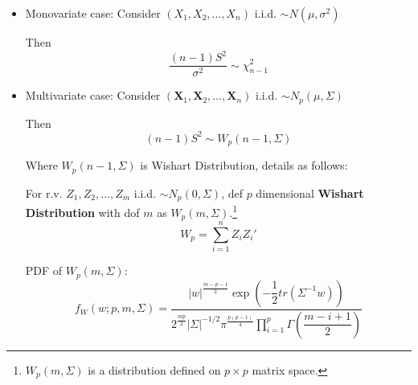 \begin{itemize}[topsep=2pt,itemsep=2pt]
    \item Monovariate case: Consider $ (X_1,X_2,\ldots,X_n) $ i.i.d. $ \sim N(\mu,\sigma ^2) $

    
    

    Then 
    \[
        \dfrac{(n-1)S^2}{\sigma ^2}\sim \chi^2_{n-1} 
    \]
    
    \item Multivariate case: Consider $ (\mathbf{X}_{1},\mathbf{X}_{2},\ldots,\mathbf{X}_{n})  $ i.i.d. $ \sim N_p(\mu,\Sigma ) $
    
    Then
    \[
        (n-1) S^2\sim W_p(n-1,\Sigma )
    \]
    
    Where $ W_p(n-1,\Sigma ) $ is Wishart Distribution, details as follows:

         For r.v. $ Z_1,Z_2,\ldots,Z_m $ i.i.d. $ \sim N_p(0,\Sigma  ) $, def $ p $ dimensional \textbf{Wishart Distribution } with dof $ m $ as $ W_p(m,\Sigma ) $.\footnote{$ W_p(m,\Sigma ) $ is a distribution defined on $ p\times p $ matrix space.}
        \begin{equation}
            W_p=\sum_{i=1}^nZ_iZ_i' 
        \end{equation}

        
        PDF of $ W_p(m,\Sigma ) $:
        \begin{equation}
            f_W(w;p,m,\Sigma )= \dfrac{|w|^{\frac{m-p-1}{2}}\exp\left( -\dfrac{1}{2}tr(\Sigma ^{-1}w) \right)}{2^{\frac{mp}{2}}|\Sigma |^{-1/2}\pi^{\frac{p(p-1)}{4}}{\displaystyle\prod_{i=1}^p\Gamma (\dfrac{m-i+1}{2})} }
        \end{equation}


\end{itemize}
